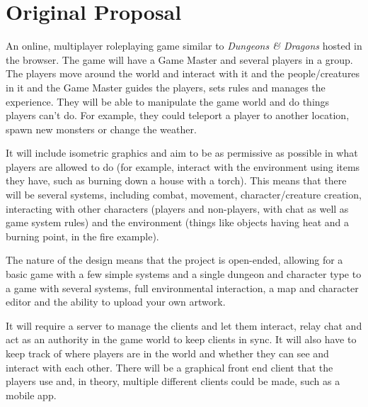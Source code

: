 \chapter{Original Proposal}\label{appendix:originalproposal}

An online, multiplayer roleplaying game similar to \textit{Dungeons \& Dragons} hosted in the browser. The game will have a Game Master and several players in a group. The players move around the world and interact with it and the people/creatures in it and the Game Master guides the players, sets rules and manages the experience. They will be able to manipulate the game world and do things players can't do. For example, they could teleport a player to another location, spawn new monsters or change the weather.

It will include isometric graphics and aim to be as permissive as possible in what players are allowed to do (for example, interact with the environment using items they have, such as burning down a house with a torch). This means that there will be several systems, including combat, movement, character/creature creation, interacting with other characters (players and non-players, with chat as well as game system rules) and the environment (things like objects having heat and a burning point, in the fire example).

The nature of the design means that the project is open-ended, allowing for a basic game with a few simple systems and a single dungeon and character type to a game with several systems, full environmental interaction, a map and character editor and the ability to upload your own artwork.

It will require a server to manage the clients and let them interact, relay chat and act as an authority in the game world to keep clients in sync. It will also have to keep track of where players are in the world and whether they can see and interact with each other. There will be a graphical front end client that the players use and, in theory, multiple different clients could be made, such as a mobile app.